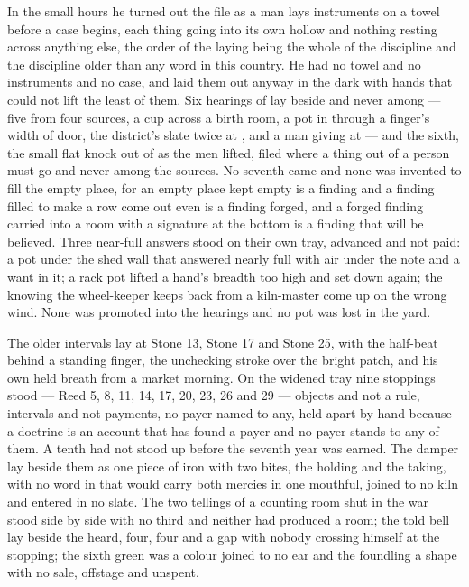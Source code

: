 In the small hours he turned out the file as a man lays instruments on a towel before a case begins, each thing going into its own hollow and nothing resting across anything else, the order of the laying being the whole of the discipline and the discipline older than any word in this country. He had no towel and no instruments and no case, and laid them out anyway in the dark with hands that could not lift the least of them. Six hearings of  lay beside and never among --- five from four sources, a cup across a birth room, a pot in  through a finger's width of door, the district's slate twice at , and a man giving at  --- and the sixth, the small flat knock out of  as the men lifted, filed where a thing out of a person must go and never among the sources. No seventh came and none was invented to fill the empty place, for an empty place kept empty is a finding and a finding filled to make a row come out even is a finding forged, and a forged finding carried into a room with a signature at the bottom is a finding that will be believed. Three near-full answers stood on their own tray, advanced and not paid: a pot under the shed wall that answered nearly full with air under the note and a want in it; a rack pot lifted a hand's breadth too high and set down again; the knowing the wheel-keeper keeps back from a kiln-master come up on the wrong wind. None was promoted into the hearings and no pot was lost in the yard.

The older intervals lay at Stone 13, Stone 17 and Stone 25, with the half-beat behind a standing finger, the unchecking stroke over the bright patch, and his own held breath from a market morning. On the widened tray nine stoppings stood --- Reed 5, 8, 11, 14, 17, 20, 23, 26 and 29 --- objects and not a rule, intervals and not payments, no payer named to any, held apart by hand because a doctrine is an account that has found a payer and no payer stands to any of them. A tenth had not stood up before the seventh year was earned. The damper lay beside them as one piece of iron with two bites, the holding and the taking, with no word in  that would carry both mercies in one mouthful, joined to no kiln and entered in no slate. The two tellings of a counting room shut in the war stood side by side with no third and neither had produced a room; the told bell lay beside the heard, four, four and a gap with nobody crossing himself at the stopping; the sixth green was a colour joined to no ear and the foundling a shape with no sale, offstage and unspent.

